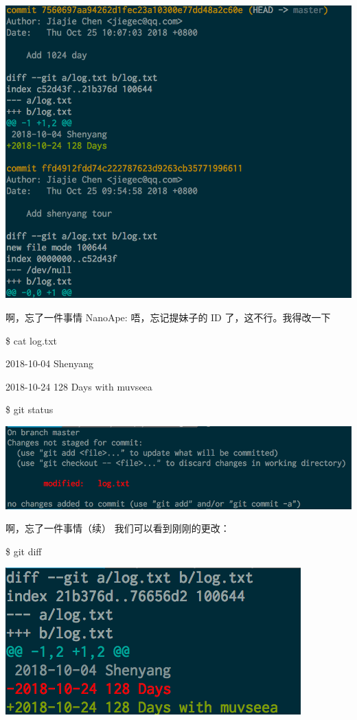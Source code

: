 \documentclass{beamer}
\begin{document}
\begin{frame}
    \includegraphics[width=\linewidth]{2018-10-25-10-46-39.png}
\end{frame}

\begin{frame}{啊，忘了一件事情}
    NanoApe: 唔，忘记提妹子的 ID 了，这不行。我得改一下

    \$ cat log.txt

    2018-10-04 Shenyang

    2018-10-24 128 Days with muvseea

    \$ git status

    \includegraphics[width=\linewidth]{2018-10-25-10-49-26.png}
\end{frame}

\begin{frame}{啊，忘了一件事情（续）}
    我们可以看到刚刚的更改：

    \$ git diff

    \includegraphics[width=\linewidth]{2018-10-25-10-50-20.png}
\end{frame}
\end{document}

